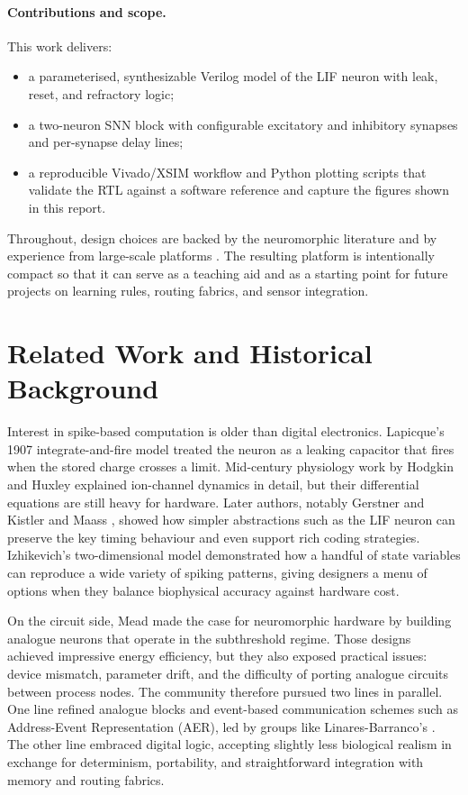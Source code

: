 \documentclass[10pt,onecolumn]{IEEEtran}
\begin{document}
\paragraph*{Contributions and scope.}
This work delivers:
\begin{itemize}
  \item a parameterised, synthesizable Verilog model of the LIF neuron with leak, reset, and refractory logic;
  \item a two-neuron SNN block with configurable excitatory and inhibitory synapses and per-synapse delay lines;
  \item a reproducible Vivado/XSIM workflow and Python plotting scripts that validate the RTL against a software reference and capture the figures shown in this report.
\end{itemize}
Throughout, design choices are backed by the neuromorphic literature \cite{GerstnerKistler2002,Maass1997,Izhikevich2003,Mead1990,IndiveriLiu2015} and by experience from large-scale platforms \cite{Furber2014,Merolla2014,Davies2018,Rueckauer2017,LinaresBarranco2011}. The resulting platform is intentionally compact so that it can serve as a teaching aid and as a starting point for future projects on learning rules, routing fabrics, and sensor integration.

\section{Related Work and Historical Background}
\label{sec:related}

Interest in spike-based computation is older than digital electronics. Lapicque’s 1907 integrate-and-fire model treated the neuron as a leaking capacitor that fires when the stored charge crosses a limit. Mid-century physiology work by Hodgkin and Huxley explained ion-channel dynamics in detail, but their differential equations are still heavy for hardware. Later authors, notably Gerstner and Kistler \cite{GerstnerKistler2002} and Maass \cite{Maass1997}, showed how simpler abstractions such as the LIF neuron can preserve the key timing behaviour and even support rich coding strategies. Izhikevich’s two-dimensional model \cite{Izhikevich2003} demonstrated how a handful of state variables can reproduce a wide variety of spiking patterns, giving designers a menu of options when they balance biophysical accuracy against hardware cost.

On the circuit side, Mead \cite{Mead1990} made the case for neuromorphic hardware by building analogue neurons that operate in the subthreshold regime. Those designs achieved impressive energy efficiency, but they also exposed practical issues: device mismatch, parameter drift, and the difficulty of porting analogue circuits between process nodes. The community therefore pursued two lines in parallel. One line refined analogue blocks and event-based communication schemes such as Address-Event Representation (AER), led by groups like Linares-Barranco’s \cite{LinaresBarranco2011}. The other line embraced digital logic, accepting slightly less biological realism in exchange for determinism, portability, and straightforward integration with memory and routing fabrics.
\end{document}
